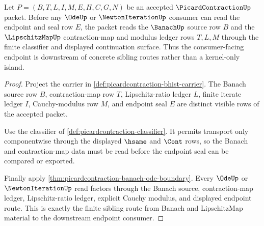 \begin{theorem}
\label{thm:picardcontraction-cauchy-modulus-sibling-route}
Let $P=(B,T,L,I,M,E,H,C,G,N)$ be an accepted $\PicardContractionUp$ packet. Before any $\OdeUp$ or $\NewtonIterationUp$ consumer can read the endpoint and seal row $E$, the packet reads the $\BanachUp$ source row $B$ and the $\LipschitzMapUp$ contraction-map and modulus ledger rows $T,L,M$ through the finite classifier and displayed continuation surface. Thus the consumer-facing endpoint is downstream of concrete sibling routes rather than a kernel-only island.
\end{theorem}
\begin{proof}
Project the carrier in \autoref{def:picardcontraction-bhist-carrier}. The Banach source row $B$, contraction-map row $T$, Lipschitz-ratio ledger $L$, finite iterate ledger $I$, Cauchy-modulus row $M$, and endpoint seal $E$ are distinct visible rows of the accepted packet.

Use the classifier of \autoref{def:picardcontraction-classifier}. It permits transport only componentwise through the displayed $\hsame$ and $\Cont$ rows, so the Banach and contraction-map data must be read before the endpoint seal can be compared or exported.

Finally apply \autoref{thm:picardcontraction-banach-ode-boundary}. Every $\OdeUp$ or $\NewtonIterationUp$ read factors through the Banach source, contraction-map ledger, Lipschitz-ratio ledger, explicit Cauchy modulus, and displayed endpoint route. This is exactly the finite sibling route from Banach and LipschitzMap material to the downstream endpoint consumer.
\end{proof}

